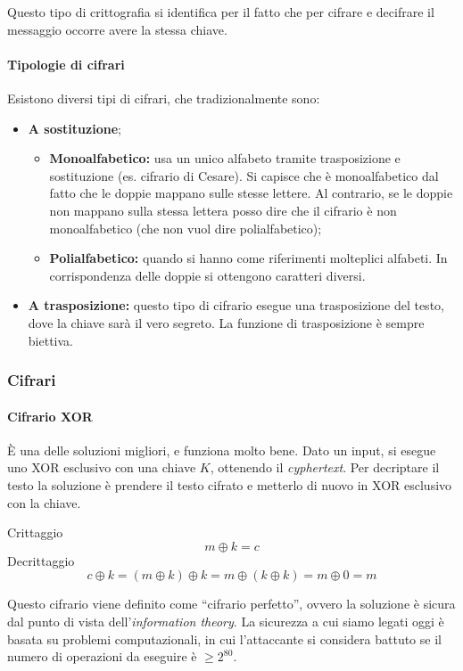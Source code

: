 Questo tipo di crittografia si identifica per il fatto che per cifrare e
decifrare il messaggio occorre avere la stessa chiave.

\paragraph*{Tipologie di cifrari} Esistono diversi tipi di cifrari, che
tradizionalmente sono:
\begin{itemize}
 \item \textbf{A sostituzione};
 \begin{itemize}
  \item \textbf{Monoalfabetico:} usa un unico alfabeto tramite trasposizione e
sostituzione (es. cifrario di Cesare). Si capisce che è monoalfabetico dal fatto
che le doppie mappano sulle stesse lettere.
Al contrario, se le doppie non mappano sulla stessa lettera posso dire che il
cifrario è non monoalfabetico (che non vuol dire polialfabetico);
  \item \textbf{Polialfabetico:} quando si hanno come riferimenti molteplici alfabeti.
 In corrispondenza delle doppie si ottengono caratteri diversi.
 \end{itemize}
 \item \textbf{A trasposizione:} questo tipo di cifrario esegue una trasposizione del testo, dove la chiave sarà
il vero segreto. La funzione di trasposizione è sempre biettiva.
\end{itemize}

\subsubsection{Cifrari}

\paragraph{Cifrario XOR}

È una delle soluzioni migliori, e funziona molto bene. Dato un input, si esegue
uno XOR esclusivo con una chiave $K$, ottenendo il \textit{cyphertext}. Per
decriptare il testo la soluzione è prendere il testo cifrato e metterlo di nuovo
in XOR esclusivo con la chiave.

Crittaggio
$$
m \oplus k = c
$$
\indent Decrittaggio
$$
c \oplus k = (m \oplus k) \oplus k = m \oplus (k \oplus k) = m \oplus 0 = m
$$

Questo cifrario viene definito come ``cifrario perfetto'', ovvero la soluzione è
sicura dal punto di vista dell'\textit{information theory}. La sicurezza a cui
siamo legati oggi è basata su problemi computazionali, in cui l'attaccante si
considera battuto se il numero di operazioni da eseguire è $\ge 2^{80}$.

